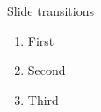 \begin{frame}{Slide transitions}
  \begin{enumerate}
    \item<1,2> First
    \item<2> Second
    \item<3> Third
  \end{enumerate}
\end{frame}




